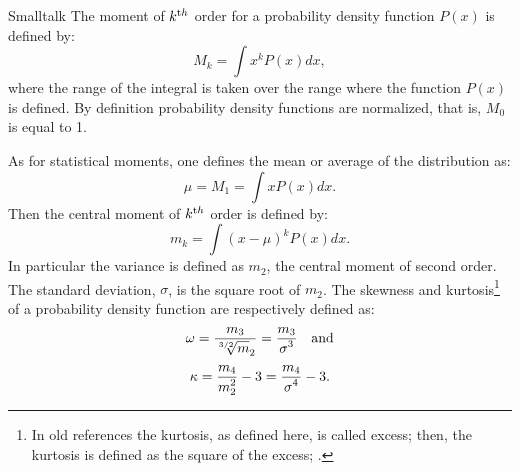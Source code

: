 \begin{displaycode}{Smalltalk}
The moment of $k^{\mathop{\textrm th}}$ order for a probability
density function $P\left(x\right)$ is defined by:
\begin{equation}
\label{eq:probdensity}
  M_k=\int x^k P\left(x\right) dx,
\end{equation}
where the range of the integral is taken over the range where the
function $P\left(x\right)$ is defined. By definition probability
density functions are normalized, that is, $M_0$ is equal to 1.

As for statistical moments, one defines the mean or average of the
distribution as:
\begin{equation}
  \mu=M_1=\int x P\left(x\right) dx.
\end{equation}
Then the central moment of $k^{\mathop{\textrm th}}$ order is defined
by:
\begin{equation}
  m_k=\int \left(x-\mu\right)^k P\left(x\right) dx.
\end{equation}
In particular the variance is defined as $m_2$, the central moment
of second order. The standard deviation, $\sigma$, is the square
root of $m_2$. The skewness and kurtosis\footnote{In old
references the kurtosis, as defined here, is called excess; then,
the kurtosis is defined as the square of the excess;
\cite{AbrSteg} \eg.} of a probability density function are
respectively defined as:
\begin{equation}
  \omega={\displaystyle m_3 \over\displaystyle {\root 3/2 \of m_2}}
  ={\displaystyle m_3 \over\displaystyle \sigma^3}\mbox{\quad and}
\end{equation}
\begin{equation}
  \kappa={\displaystyle m_4 \over\displaystyle m_2^2}-3
  ={\displaystyle m_4 \over\displaystyle \sigma^4}-3.
\end{equation}


\end{displaycode}
